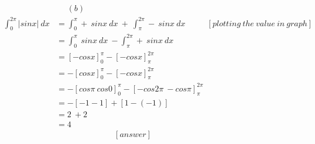 \documentclass[12pt]{article}%
\begin{document}
\begin{align*}
    &\ \ \  \ \ \ (b)\\
    \int_{0}^{2\pi} \left | sinx \right |\:dx &= \int_{0}^{\pi} +\:sinx\:dx \: + \: \int_{\pi}^{2\pi} -\: sinx\:dx\ \ \ \ \ \ \ \ \ \ \ \ \left[ plotting \ the \ value \ in \ graph\right]\\
    &= \int_{0}^{\pi} \:sinx\:dx \: - \int_{\pi}^{2\pi} +\:sinx\:dx \\
    &= \left[-cosx\right]_{0}^{\pi} - \left[-cosx \right]_{\pi}^{2\pi}\\
    &= -\left[cosx\right]_{0}^{\pi} - \left[-cosx \right]_{\pi}^{2\pi}\\
    &= -\left[cos\pi \: cos0 \right]_{0}^{\pi} - \left[-cos2\pi \: - cos\pi \right]_{\pi}^{2\pi}\\
    &= -\left[-1-1\right] + \left[1-(-1)\right]\\
    &= 2 \: + 2\\
    &= 4\\
    & \ \ \ \ \ \ \ \ \ \ \ \ \ \ \ \ \ \ \ \ \ \ \ \ \ \ \ \ \ \ \ \ [answer]\\
\end{align*}
\end{document}
